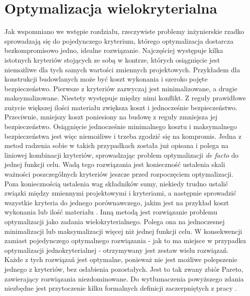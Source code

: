 \section{Optymalizacja wielokryterialna} \label{sect: multiobjective_opt}
Jak wspomniano we wstępie rozdziału, rzeczywiste problemy inżynierskie rzadko sprowadzają się do pojedynczego kryterium, którego optymalizacja dostarcza bezkompromisowo jedno, idealne rozwiązanie. Najczęściej występuje kilka istotnych kryteriów stojących ze sobą w kontrze, których osiągnięcie jest niemożliwe dla tych samych wartości zmiennych projektowych. Przykładem dla konstrukcji budowlanych może być koszt wykonania i szeroko pojęte bezpieczeństwo. Pierwsze z kryteriów zazwyczaj jest minimalizowane, a drugie maksymalizowane. Niestety występuje między nimi konflikt. Z reguły prawidłowe zużycie większej ilości materiału zwiększa koszt i jednocześnie bezpieczeństwo. Przeciwnie, mniejszy koszt poniesiony na budowę z reguły zmniejsza jej bezpieczeństwo. Osiągnięcie jednocześnie minimalnego kosztu i maksymalnego bezpieczeństwa jest więc niemożliwe i trzeba zgodzić się na kompromis. Jedna z metod radzenia sobie w takich przypadkach została już opisana i polega na liniowej kombinacji kryteriów, sprowadzając problem optymalizacji \textit{de facto} do jednej funkcji celu. Wadą tego rozwiązania jest konieczność ustalenia skali ważności poszczególnych kryteriów jeszcze przed rozpoczęciem optymalizacji. Poza koniecznością ustalenia wag składników sumy, niekiedy trudno ustalić związki między zmiennymi projektowymi i kryteriami, a następnie sprowadzić wszystkie kryteria do jednego porównawczego, jakim jest na przykład koszt wykonania lub ilość materiału \parencite{Szymczak1995}. Inną metodą jest rozwiązanie problemu optymalizacji jako zadania wielokryterialnego. Polega ona na jednoczesnej minimalizacji lub maksymalizacji więcej niż jednej funkcji celu. W konsekwencji zamiast pojedynczego optymalnego rozwiązania - jak to ma miejsce w przypadku optymalizacji jednokryterialnej - otrzymywany jest zestaw wielu rozwiązań. Każde z tych rozwiązań jest optymalne, ponieważ nie jest możliwe polepszenie jednego z kryteriów, bez osłabienia pozostałych. Jest to tak zwany zbiór Pareto, zawierający rozwiązania niezdominowane. Do wytłumaczenia powyższego zdania niezbędne jest przytoczenie kilku formalnych definicji zaczerpniętych z pracy \parencite{CoelloCoello2006}. 

